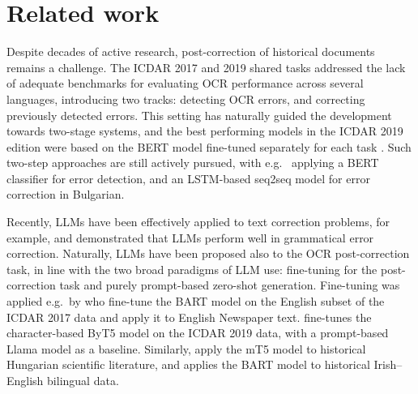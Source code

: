 \section{Related work}
Despite decades of active research, post-correction of historical documents remains a challenge. The ICDAR 2017 and 2019 shared tasks \citep{icdar2017,icdar2019} addressed the lack of adequate benchmarks for evaluating OCR performance across several languages, introducing two tracks: detecting OCR errors, and correcting previously detected errors. This setting has naturally guided the development towards two-stage systems, and the best performing models in the ICDAR 2019 edition were based on the BERT model fine-tuned separately for each task \citep{icdar2019}. Such two-step approaches are still actively pursued, with e.g.\ \citet{beshirov2024postocrtextcorrectionbulgarian} applying a BERT classifier for error detection, and an LSTM-based seq2seq model for error correction in Bulgarian.





Recently, LLMs have been effectively applied to text correction problems, for example, \citet{penteado2023evaluating} and \citet{ostling-etal-2024-evaluation} demonstrated that LLMs perform well in grammatical error correction. Naturally, LLMs have been proposed also to the OCR post-correction task, in line with the two broad paradigms of LLM use: fine-tuning for the post-correction task and purely prompt-based zero-shot generation. Fine-tuning was applied e.g.\ by \citet{soper-etal-2021-bart} who fine-tune the BART model on the English subset of the ICDAR 2017 data and apply it to English Newspaper text. \citet{veninga2024msc} fine-tunes the character-based ByT5 model on the ICDAR 2019 data, with a prompt-based Llama model as a baseline. Similarly, \citet{madarasz2024ocrcleaning} apply the mT5 model to historical Hungarian scientific literature, and \citet{dereza-etal-2024-million} applies the BART model to historical Irish--English bilingual data. 



